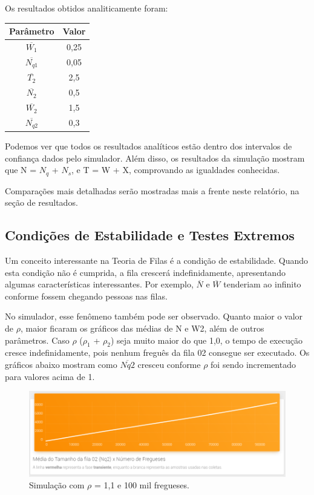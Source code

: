 \documentclass[a4paper,12pt]{report}
\begin{document}
\vspace{-5mm}

Os resultados obtidos analiticamente foram:
\vspace{-2mm}
\begin{center}
\begin{tabular}{c c}
  \hline
  \textbf{Parâmetro} & \textbf{Valor}\\
  \hline
  $\overline{W_1}$ & 0,25 \\
  $\overline{N_{q1}}$ & 0,05 \\
  $\overline{T_2}$ & 2,5 \\
  $\overline{N_2}$ & 0,5 \\
  $\overline{W_2}$ & 1,5 \\
  $\overline{N_{q2}}$ & 0,3 \\
  \hline
\end{tabular}
\end{center}

Podemos ver que todos os resultados analíticos estão dentro dos intervalos de confiança dados pelo simulador. Além disso, os resultados da simulação mostram que N = $N_{q}$ + $N_{s}$, e T = W + X, comprovando as igualdades conhecidas.

Comparações mais detalhadas serão mostradas mais a frente neste relatório, na seção de resultados.


\subsection{Condições de Estabilidade e Testes Extremos}
Um conceito interessante na Teoria de Filas é a condição de estabilidade. Quando esta condição não é cumprida, a fila crescerá indefinidamente, apresentando algumas características interessantes. Por exemplo, $\overline{N}$ e $\overline{W}$ tenderiam ao infinito conforme fossem chegando pessoas nas filas.

No simulador, esse fenômeno também pode ser observado. Quanto maior o valor de $\rho$, maior ficaram os gráficos das médias de N e W2, além de outros parâmetros. Caso $\rho$ ($\rho_1$ + $\rho_2$) seja muito maior do que 1,0, o tempo de execução cresce indefinidamente, pois nenhum freguês da fila 02 consegue ser executado. Os gráficos abaixo mostram como $\overline{Nq2}$ cresceu conforme $\rho$ foi sendo incrementado para valores acima de 1.

\begin{figure}[H]
\includegraphics[width=1\textwidth]{./graficos/nq2rho1_1.png}
\vspace{-10mm}
\caption{Simulação com $\rho$ = 1,1 e 100 mil fregueses.}
\end{figure}
\end{document}
